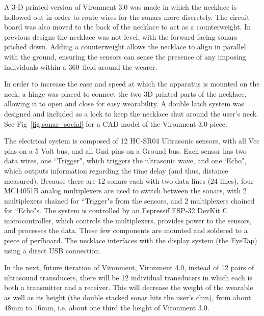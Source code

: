 \documentclass[journal]{journal}
\begin{document}
A 3-D printed version of Vironment 3.0 was made in which the necklace is hollowed out in order to route wires for the sonars more discretely. The circuit board was also moved to the back of the necklace to act as a counterweight. In previous designs the necklace was not level, with the forward facing sonars pitched down.  Adding a counterweight allows the necklace to align in parallel with the ground, ensuring the sensors can sense the presence of any imposing individuals within a 360\degree\ field around the wearer. 

In order to increase the ease and speed at which the apparatus is mounted on the neck, a hinge was placed to connect the two 3D printed parts of the necklace, allowing it to open and close for easy wearability. A double latch system was designed and included as a lock to keep the necklace shut around the user's neck. See Fig~\ref{fig:sonar_social} for a CAD model of the Vironment 3.0 piece.

The electrical system is composed of 12 HC-SR04 Ultrasonic sensors, with all Vcc pins on a 5 Volt bus, and all Gnd pins on a Ground bus. Each sensor has two data wires, one ``Trigger", which triggers the ultrasonic wave, and one `Echo", which outputs information regarding the time delay (and thus, distance measured). Because there are 12 sonars each with two data lines (24 lines), four MC14051B analog multiplexers are used to switch between the sonars, with 2 multiplexers chained for ``Trigger"s
from the sensors, and 2 multiplexers chained for ``Echo"s. The system is controlled by an Espressif ESP-32 DevKit C microcontroller, which controls the multiplexers, provides power to the sensors, and processes the data. These few components are mounted and soldered to a piece of perfboard. The necklace interfaces with the display system (the EyeTap) using a direct USB connection.

In the next, future iteration of Vironment, Vironment 4.0, instead of 12 pairs of ultrasound transducers, there will be 12 individual transducers in which each is both a transmitter and a receiver. This will decrease the weight of the wearable as well as its height (the double stacked sonar hits the user's chin), from about 48mm to 16mm, i.e. about one third the height of Vironment 3.0.

\end{document}

